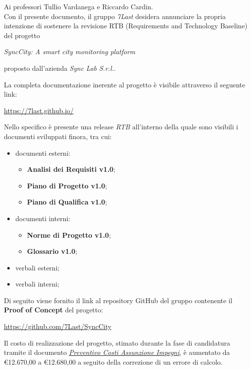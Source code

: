 \documentclass[italian,12pt]{article} %
\begin{document}

\newpage

\begin{flushleft}
    Ai professori Tullio Vardanega e Riccardo Cardin.\\
    Con il presente documento, il gruppo \textit{7Last} desidera annunciare la propria intenzione di sostenere la revisione RTB (Requirements and Technology Baseline) del progetto 
    \begin{center}
        \textit{SyncCity: A smart city monitoring platform} 
    \end{center}
    proposto dall'azienda \textit{Sync Lab S.r.l.}.
\end{flushleft}
\begin{flushleft}
    La completa documentazione inerente al progetto è visibile attraverso il seguente link:  
    \begin{center}
        \url{https://7last.github.io/}
    \end{center}
\end{flushleft}
\begin{flushleft}
    Nello specifico è presente una release \textit{RTB} all'interno della quale sono visibili i documenti sviluppati finora, tra cui:
    \begin{itemize}
        \item documenti esterni:
        \begin{itemize}
            \item \textbf{Analisi dei Requisiti v1.0};
            \item \textbf{Piano di Progetto v1.0};
            \item \textbf{Piano di Qualifica v1.0};
        \end{itemize}
        \item documenti interni:
        \begin{itemize}
            \item \textbf{Norme di Progetto v1.0};
            \item \textbf{Glossario v1.0};
        \end{itemize}
        \item verbali esterni;
        \item verbali interni;
    \end{itemize}
\end{flushleft}
\newblock

\begin{flushleft}
    Di seguito viene fornito il link al repository GitHub del gruppo contenente il \textbf{Proof of Concept} del progetto:
    \begin{center}
        \url{https://github.com/7Last/SyncCity}
    \end{center}
    Il costo di realizzazione del progetto, stimato durante la fase di candidatura tramite il documento \href{https://7last.github.io/docs/candidatura/preventivo-costi-assunzione-impegni}{\textit{Preventivo Costi Assunzione Impegni}}, è aumentato da €12.670,00 a €12.680,00 a seguito della correzione di un errore di calcolo.\\
\end{flushleft}
\end{document}
